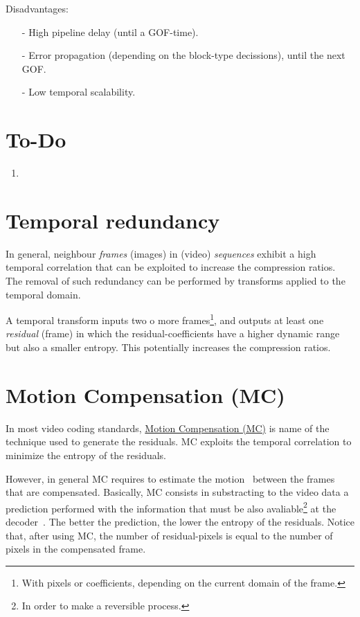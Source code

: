 Disadvantages:
\begin{enumerate}
\item [-] High pipeline delay (until a GOF-time).
\item [-] Error propagation (depending on the block-type decissions),
  until the next GOF.
\item [-] Low temporal scalability.
\end{enumerate}

\section{To-Do}
\begin{enumerate}
\item 
\end{enumerate}

\section{Temporal redundancy}

In general, neighbour \emph{frames} (images) in (video)
\emph{sequences} exhibit a high temporal correlation that can be
exploited to increase the compression ratios. The removal of such
redundancy can be performed by transforms applied to the temporal
domain.

A temporal transform inputs two o more frames\footnote{With pixels or
coefficients, depending on the current domain of the frame.}, and
outputs at least one \emph{residual} (frame) in which the
residual-coefficients have a higher dynamic range but also a smaller
entropy. This potentially increases the compression ratios.


\section{Motion Compensation (MC)}

In most video coding standards,
\href{https://en.wikipedia.org/wiki/Motion_compensation}{Motion
  Compensation (MC)} is name of the technique used to generate the
residuals. MC exploits the temporal correlation to minimize the
entropy of the residuals.

However, in general MC requires to estimate the
motion~\cite{vruiz__ME} between the frames that are
compensated. Basically, MC consists in substracting to the video data
a prediction performed with the information that must be also
avaliable\footnote{In order to make a reversible process.} at the
decoder~\cite{vruiz__MCT}. The better the prediction, the lower the
entropy of the residuals. Notice that, after using MC, the number of
residual-pixels is equal to the number of pixels in the compensated
frame.

